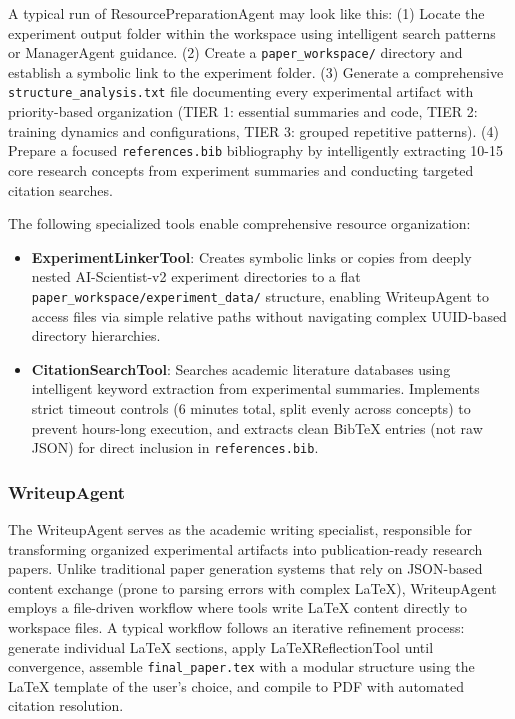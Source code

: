 \documentclass{article}
\begin{document}
A typical run of ResourcePreparationAgent may look like this: (1) Locate the experiment output folder within the workspace using intelligent search patterns or ManagerAgent guidance. (2) Create a \texttt{paper\_workspace/} directory and establish a symbolic link to the experiment folder. (3) Generate a comprehensive \texttt{structure\_analysis.txt} file documenting every experimental artifact with priority-based organization (TIER 1: essential summaries and code, TIER 2: training dynamics and configurations, TIER 3: grouped repetitive patterns). (4) Prepare a focused \texttt{references.bib} bibliography by intelligently extracting 10-15 core research concepts from experiment summaries and conducting targeted citation searches.

The following specialized tools enable comprehensive resource organization:
\begin{itemize}
\item \textbf{ExperimentLinkerTool}: Creates symbolic links or copies from deeply nested AI-Scientist-v2 experiment directories to a flat \texttt{paper\_workspace/experiment\_data/} structure, enabling WriteupAgent to access files via simple relative paths without navigating complex UUID-based directory hierarchies.
\item \textbf{CitationSearchTool}: Searches academic literature databases using intelligent keyword extraction from experimental summaries. Implements strict timeout controls (6 minutes total, split evenly across concepts) to prevent hours-long execution, and extracts clean BibTeX entries (not raw JSON) for direct inclusion in \texttt{references.bib}.
\end{itemize}

\subsubsection*{WriteupAgent}
The WriteupAgent serves as the academic writing specialist, responsible for transforming organized experimental artifacts into publication-ready research papers. Unlike traditional paper generation systems that rely on JSON-based content exchange (prone to parsing errors with complex LaTeX), WriteupAgent employs a file-driven workflow where tools write LaTeX content directly to workspace files. A typical workflow follows an iterative refinement process: generate individual LaTeX sections, apply LaTeXReflectionTool until convergence, assemble \texttt{final\_paper.tex} with a modular structure using the LaTeX template of the user's choice, and compile to PDF with automated citation resolution.
\end{document}
